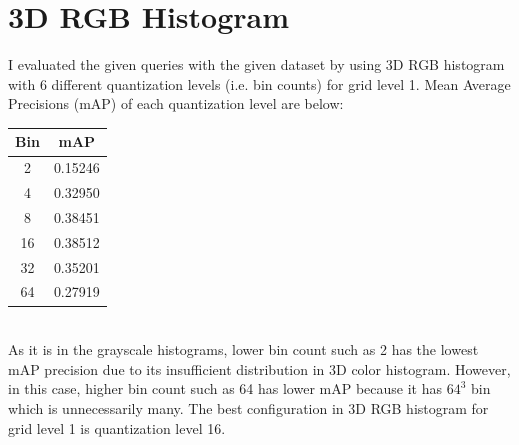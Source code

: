 \documentclass[12pt]{article}
\begin{document}
\section{3D RGB Histogram}
\qquad I evaluated the given queries with the given dataset by using 3D RGB histogram with 6 different quantization levels (i.e. bin counts) for grid level 1. Mean Average Precisions (mAP) of each quantization level are below: \\

\begin{minipage}{\textwidth}
	\begin{minipage}{0.49\textwidth}
		\centering
		\captionsetup{width=.9\textwidth}
	 \end{minipage}
	 \hfill
	\begin{minipage}{0.49\textwidth}
		\centering
		\begin{tabular}{ | c | c | }
		  \hline			
		  \bf Bin & \bf mAP \\
		  \hline		
		  2 & 0.15246 \\
		  \hline	
		  4 & 0.32950 \\
		  \hline	
		  8 & 0.38451 \\
		  \hline	
		  16 & 0.38512 \\
		  \hline	
		  32 & 0.35201 \\
		  \hline	
		  64 & 0.27919 \\
		  \hline
		\end{tabular}
		\captionsetup{width=.8\textwidth}
	\end{minipage}
\end{minipage} \\

\qquad As it is in the grayscale histograms, lower bin count such as 2 has the lowest mAP precision due to its insufficient distribution in 3D color histogram. However, in this case, higher bin count such as 64 has lower mAP because it has $64^{3}$ bin which is unnecessarily many. The best configuration in 3D RGB histogram for grid level 1 is quantization level 16.
\end{document}

